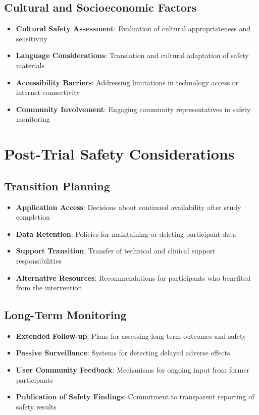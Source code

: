 \subsection{Cultural and Socioeconomic Factors}
\begin{itemize}
    \item \textbf{Cultural Safety Assessment}: Evaluation of cultural appropriateness and sensitivity
    
    \item \textbf{Language Considerations}: Translation and cultural adaptation of safety materials
    
    \item \textbf{Accessibility Barriers}: Addressing limitations in technology access or internet connectivity
    
    \item \textbf{Community Involvement}: Engaging community representatives in safety monitoring
\end{itemize}

\section{Post-Trial Safety Considerations}
\subsection{Transition Planning}
\begin{itemize}
    \item \textbf{Application Access}: Decisions about continued availability after study completion
    
    \item \textbf{Data Retention}: Policies for maintaining or deleting participant data
    
    \item \textbf{Support Transition}: Transfer of technical and clinical support responsibilities
    
    \item \textbf{Alternative Resources}: Recommendations for participants who benefited from the intervention
\end{itemize}

\subsection{Long-Term Monitoring}
\begin{itemize}
    \item \textbf{Extended Follow-up}: Plans for assessing long-term outcomes and safety
    
    \item \textbf{Passive Surveillance}: Systems for detecting delayed adverse effects
    
    \item \textbf{User Community Feedback}: Mechanisms for ongoing input from former participants
    
    \item \textbf{Publication of Safety Findings}: Commitment to transparent reporting of safety results
\end{itemize}

